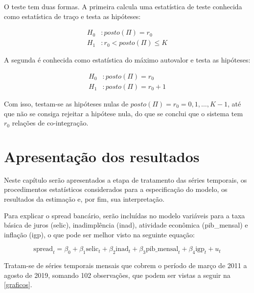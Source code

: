 \documentclass[a4paper,
               article,
               12pt,
               openany,
               oneside,
               english,
               brazil]{abntex2}
\numberwithin{equation}{section}
\begin{document}
   O teste tem duas formas. A primeira calcula uma estatística de teste conhecida como estatística de traço e testa as hipóteses:

   \begin{equation}
       \label{trace}
       \begin{aligned}
           H_0&: posto(\Pi) = r_0 \\
           H_1&: r_0 < posto(\Pi) \leq K
       \end{aligned}
   \end{equation}

   A segunda é conhecida como estatística do máximo autovalor e testa as hipóteses:

   \begin{equation}
       \label{trace}
       \begin{aligned}
           H_0&: posto(\Pi) = r_0 \\
           H_1&: posto(\Pi) = r_0 + 1
       \end{aligned}
   \end{equation}

   Com isso, testam-se as hipóteses nulas de $ posto(\Pi) = r_0 = 0, 1, \dots, K-1 $, até que não se consiga rejeitar a hipótese nula, do que se conclui que o sistema tem $ r_0 $ relações de co-integração.

   \section{Apresentação dos resultados}

   Neste capítulo serão apresentados a etapa de tratamento das séries temporais, os procedimentos estatísticos considerados para a especificação do modelo, os resultados da estimação e, por fim, sua interpretação.

   Para explicar o spread bancário, serão incluídas no modelo variáveis para a taxa básica de juros (selic), inadimplência (inad), atividade econômica (pib\_mensal) e inflação (igp), o que pode ser melhor visto na seguinte equação:

   \begin{equation}
       \label{eq_modelo}
       \text{spread}_t = \beta_0 + \beta_1 \text{selic}_t + \beta_2 \text{inad}_t + \beta_3 \text{pib\_mensal}_t + \beta_4 \text{igp}_t + u_t
   \end{equation}

   Tratam-se de séries temporais mensais que cobrem o período de março de 2011 a agosto de 2019, somando 102 observações, que podem ser vistas a seguir na \autoref{graficos}.
\end{document}
